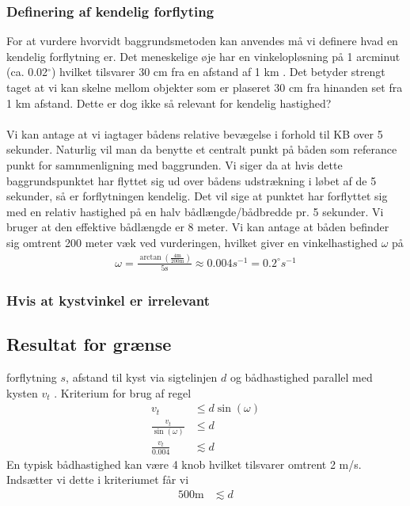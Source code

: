 \documentclass[%
 reprint,
nofootinbib,
aps,
]{revtex4-1}
\begin{document}
 \subsubsection{Definering af kendelig forflyting}
 For at vurdere hvorvidt baggrundsmetoden kan anvendes må vi definere hvad en kendelig forflytning er. Det meneskelige øje har en vinkelopløsning på 1 arcminut (ca. 0.02$^{\circ}$) hvilket tilsvarer 30 cm fra en afstand af 1 km \cite{wiki:eye}. Det betyder strengt taget at vi kan skelne mellom objekter som er plaseret 30 cm fra hinanden set fra 1 km afstand. Dette er dog ikke så relevant for kendelig hastighed? \\
 \\
 Vi kan antage at vi iagtager bådens relative bevægelse i forhold til KB over 5 sekunder. Naturlig vil man da benytte et centralt punkt på båden som referance punkt for samnmenligning med baggrunden. Vi siger da at hvis dette baggrundspunktet har flyttet sig ud over bådens udstrækning i løbet af de 5 sekunder, så er forflytningen kendelig. Det vil sige at punktet har forflyttet sig med en relativ hastighed på en halv bådlængde/bådbredde pr. 5 sekunder. Vi bruger at den effektive bådlængde er 8 meter. Vi kan antage at båden befinder sig omtrent 200 meter væk ved vurderingen, hvilket giver en vinkelhastighed $\omega$ på
 \begin{align*}
   \omega = \frac{\arctan{(\frac{4 \text{m}}{200 \text{m}})}}{5 \text{s}} \approx 0.004 s^{-1} = 0.2^{\circ}s^{-1}
 \end{align*}

 \subsubsection{Hvis at kystvinkel er irrelevant}



\subsection{Resultat for grænse}
forflytning $s$, afstand til kyst via sigtelinjen $d$ og bådhastighed parallel med kysten $v_{t}$ . Kriterium for brug af regel
\begin{align*}
  v_t &\le d\sin{(\omega)} \\
  \frac{v_t}{\sin{(\omega)}} &\le d \\
  \frac{v_t}{0.004}&\lesssim d
\end{align*}
En typisk bådhastighed kan være 4 knob hvilket tilsvarer omtrent 2 m/s. Indsætter vi dette i kriteriumet får vi
\begin{align*}
  500 \text{m} &\lesssim d
\end{align*}
\end{document}

